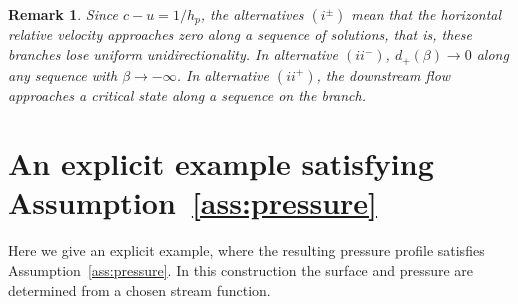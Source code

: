 \documentclass[12pt,letterpaper]{amsart}
\newtheorem{remark}[theorem]{Remark}
\numberwithin{equation}{section}
\begin{document}
\begin{remark}
Since $c-u=1/h_p$, the alternatives $(i^\pm)$ mean that the horizontal relative velocity approaches zero along a sequence of solutions, that is, these branches lose uniform unidirectionality. In alternative $(ii^-)$, $d_+(\beta)\to0$ along any sequence with $\beta\to-\infty$. In alternative $(ii^+)$, the downstream flow approaches a critical state along a sequence on the branch.
\end{remark}
		
\section{An explicit example satisfying Assumption~\ref{ass:pressure}}
	
Here we give an explicit example, where the resulting pressure profile satisfies Assumption~\ref{ass:pressure}. In this construction the surface and pressure are determined from a chosen stream function.
	
\end{document}
